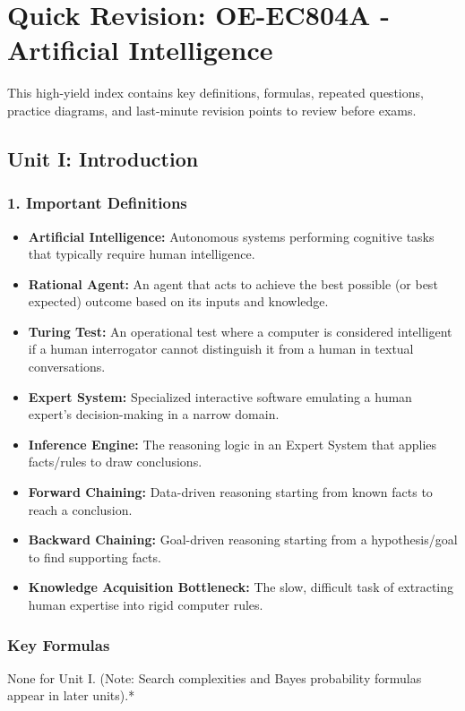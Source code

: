 \chapter{Quick Revision: OE-EC804A - Artificial Intelligence}

This high-yield index contains key definitions, formulas, repeated questions, practice diagrams, and last-minute revision points to review before exams.


\section{Unit I: Introduction}

\subsection{1. Important Definitions}
\begin{itemize}
  \item   \textbf{Artificial Intelligence:} Autonomous systems performing cognitive tasks that typically require human intelligence.
  \item   \textbf{Rational Agent:} An agent that acts to achieve the best possible (or best expected) outcome based on its inputs and knowledge.
  \item   \textbf{Turing Test:} An operational test where a computer is considered intelligent if a human interrogator cannot distinguish it from a human in textual conversations.
  \item   \textbf{Expert System:} Specialized interactive software emulating a human expert's decision-making in a narrow domain.
  \item   \textbf{Inference Engine:} The reasoning logic in an Expert System that applies facts/rules to draw conclusions.
  \item   \textbf{Forward Chaining:} Data-driven reasoning starting from known facts to reach a conclusion.
  \item   \textbf{Backward Chaining:} Goal-driven reasoning starting from a hypothesis/goal to find supporting facts.
  \item   \textbf{Knowledge Acquisition Bottleneck:} The slow, difficult task of extracting human expertise into rigid computer rules.
\end{itemize}

\subsection{Key Formulas}
\textit{   }None for Unit I. (Note: Search complexities and Bayes probability formulas appear in later units).*

